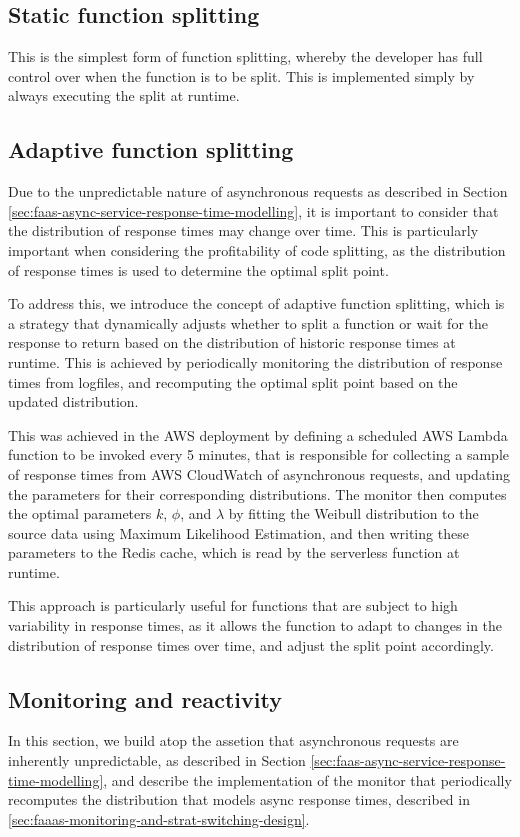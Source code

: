 \subsection{Static function splitting}
This is the simplest form of function splitting, whereby the developer has full control over when the function is to be split. This is implemented simply by always executing the split at runtime.

\subsection{Adaptive function splitting}
\label{sec:faaas-adaptive-function-splitting}
Due to the unpredictable nature of asynchronous requests as described in Section \ref{sec:faas-async-service-response-time-modelling}, it is important to consider that the distribution of response times may change over time. This is particularly important when considering the profitability of code splitting, as the distribution of response times is used to determine the optimal split point.

To address this, we introduce the concept of adaptive function splitting, which is a strategy that dynamically adjusts whether to split a function or wait for the response to return based on the distribution of historic response times at runtime. This is achieved by periodically monitoring the distribution of response times from logfiles, and recomputing the optimal split point based on the updated distribution.

This was achieved in the AWS deployment by defining a scheduled AWS Lambda function to be invoked every 5 minutes, that is responsible for collecting a sample of response times from AWS CloudWatch of asynchronous requests, and updating the parameters for their corresponding distributions. The monitor then computes the optimal parameters $k$, $\phi$, and $\lambda$ by fitting the Weibull distribution to the source data using Maximum Likelihood Estimation, and then writing these parameters to the Redis cache, which is read by the serverless function at runtime.

This approach is particularly useful for functions that are subject to high variability in response times, as it allows the function to adapt to changes in the distribution of response times over time, and adjust the split point accordingly.

\subsection{Monitoring and reactivity}
In this section, we build atop the assetion that asynchronous requests are inherently unpredictable, as described in Section \ref{sec:faas-async-service-response-time-modelling}, and describe the implementation of the monitor that periodically recomputes the distribution that models async response times, described in \ref{sec:faaas-monitoring-and-strat-switching-design}.

